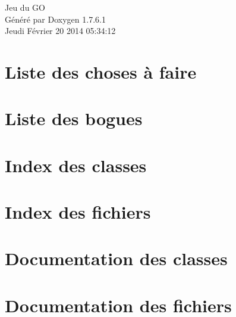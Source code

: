 \documentclass[a4paper]{book}
\begin{document}
\hypersetup{pageanchor=false,citecolor=blue}
\begin{titlepage}
\vspace*{7cm}
\begin{center}
{\Large \-Jeu du \-G\-O }\\
\vspace*{1cm}
{\large \-Généré par Doxygen 1.7.6.1}\\
\vspace*{0.5cm}
{\small Jeudi Février 20 2014 05:34:12}\\
\end{center}
\end{titlepage}
\clearemptydoublepage
{}
\tableofcontents
\clearemptydoublepage
{}
\hypersetup{pageanchor=true,citecolor=blue}
\chapter{\-Liste des choses à faire}
\label{todo}
\hypertarget{todo}{}

\chapter{\-Liste des bogues}
\label{bug}
\hypertarget{bug}{}

\chapter{\-Index des classes}

\chapter{\-Index des fichiers}

\chapter{\-Documentation des classes}







\chapter{\-Documentation des fichiers}







































\printindex
\end{document}
